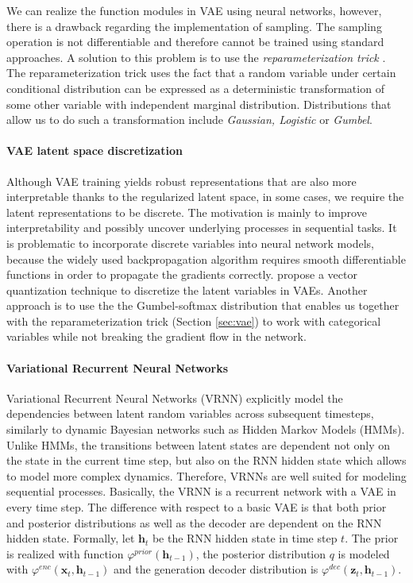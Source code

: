 We can realize the function modules in VAE using neural networks, however, there is a drawback regarding the implementation of sampling.
The sampling operation is not differentiable and therefore cannot be trained using standard approaches.
A solution to this problem is to use the \textit{reparameterization trick} \cite{kingma2013auto}.
The reparameterization trick uses the fact that a random variable under certain conditional distribution can be expressed as a deterministic transformation of some other variable with independent marginal distribution.
Distributions that allow us to do such a transformation include \textit{Gaussian, Logistic} or \textit{Gumbel}.

\paragraph{VAE latent space discretization}
Although VAE training yields robust representations that are also more interpretable thanks to the regularized latent space, in some cases, we require the latent representations to be discrete.
The motivation is mainly to improve interpretability and possibly uncover underlying processes in sequential tasks.
It is problematic to incorporate discrete variables into neural network models, because the widely used backpropagation algorithm requires smooth differentiable functions in order to propagate the gradients correctly.
\citet{van2017neural} propose a vector quantization technique to discretize the latent variables in VAEs.
Another approach is to use the the Gumbel-softmax distribution \cite{jang2016categorical} that enables us together with the reparameterization trick (Section \ref{sec:vae}) to work with categorical variables while not breaking the gradient flow in the network.

\paragraph{Variational Recurrent Neural Networks}
\label{sec:vrnn}
Variational Recurrent Neural Networks (VRNN) \cite{chung2015recurrent} explicitly model the dependencies between latent random variables across subsequent timesteps, similarly to dynamic Bayesian networks such as Hidden Markov Models (HMMs).
Unlike HMMs, the transitions between latent states are dependent not only on the state in the current time step, but also on the RNN hidden state which allows to model more complex dynamics.
Therefore, VRNNs are well suited for modeling sequential processes.
Basically, the VRNN is a recurrent network with a VAE in every time step.
The difference with respect to a basic VAE is that both prior and posterior distributions as well as the decoder are dependent on the RNN hidden state.
Formally, let $\mathbf{h}_{t}$ be the RNN hidden state in time step $t$.
The prior is realized with function $\varphi^{prior}(\mathbf{h}_{t-1})$, the posterior distribution $q$ is modeled with $\varphi^{enc}(\mathbf{x}_t, \mathbf{h}_{t-1})$ and the generation decoder distribution is $\varphi^{dec}(\mathbf{z}_t, \mathbf{h}_{t-1})$.

